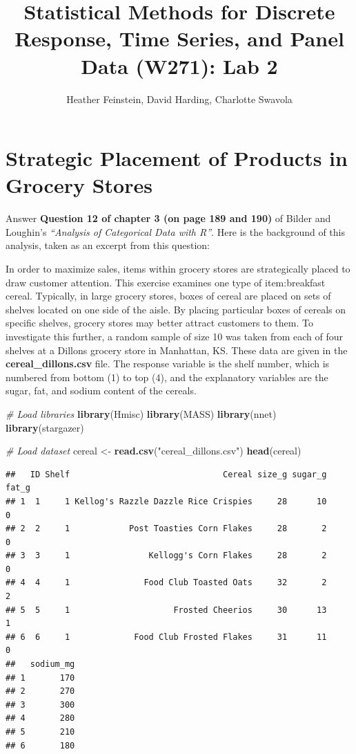 \documentclass[11pt,]{article}
\title{Statistical Methods for Discrete Response, Time Series, and Panel Data
(W271): Lab 2}
\author{Heather Feinstein, David Harding, Charlotte Swavola}
\date{}
\newenvironment{Shaded}{\begin{snugshade}}{\end{snugshade}}
\newcommand{\KeywordTok}[1]{\textcolor[rgb]{0.13,0.29,0.53}{\textbf{#1}}}
\newcommand{\StringTok}[1]{\textcolor[rgb]{0.31,0.60,0.02}{#1}}
\newcommand{\CommentTok}[1]{\textcolor[rgb]{0.56,0.35,0.01}{\textit{#1}}}
\newcommand{\NormalTok}[1]{#1}
\begin{document}
\maketitle

\section{Strategic Placement of Products in Grocery
Stores}\label{strategic-placement-of-products-in-grocery-stores}

Answer \textbf{Question 12 of chapter 3 (on page 189 and 190)} of Bilder
and Loughin's \emph{``Analysis of Categorical Data with R''}. Here is
the background of this analysis, taken as an excerpt from this question:

In order to maximize sales, items within grocery stores are
strategically placed to draw customer attention. This exercise examines
one type of item:breakfast cereal. Typically, in large grocery stores,
boxes of cereal are placed on sets of shelves located on one side of the
aisle. By placing particular boxes of cereals on specific shelves,
grocery stores may better attract customers to them. To investigate this
further, a random sample of size 10 was taken from each of four shelves
at a Dillons grocery store in Manhattan, KS. These data are given in the
\textbf{cereal\_dillons.csv} file. The response variable is the shelf
number, which is numbered from bottom (1) to top (4), and the
explanatory variables are the sugar, fat, and sodium content of the
cereals.

\begin{Shaded}
\begin{Highlighting}[]
\CommentTok{# Load libraries}
\KeywordTok{library}\NormalTok{(Hmisc)}
\KeywordTok{library}\NormalTok{(MASS)}
\KeywordTok{library}\NormalTok{(nnet)}
\KeywordTok{library}\NormalTok{(stargazer)}

\CommentTok{# Load dataset}
\NormalTok{cereal <-}\StringTok{ }\KeywordTok{read.csv}\NormalTok{(}\StringTok{"cereal_dillons.csv"}\NormalTok{)}
\KeywordTok{head}\NormalTok{(cereal)}
\end{Highlighting}
\end{Shaded}

\begin{verbatim}
##   ID Shelf                               Cereal size_g sugar_g fat_g
## 1  1     1 Kellog's Razzle Dazzle Rice Crispies     28      10     0
## 2  2     1            Post Toasties Corn Flakes     28       2     0
## 3  3     1                Kellogg's Corn Flakes     28       2     0
## 4  4     1               Food Club Toasted Oats     32       2     2
## 5  5     1                     Frosted Cheerios     30      13     1
## 6  6     1             Food Club Frosted Flakes     31      11     0
##   sodium_mg
## 1       170
## 2       270
## 3       300
## 4       280
## 5       210
## 6       180
\end{verbatim}
\end{document}
